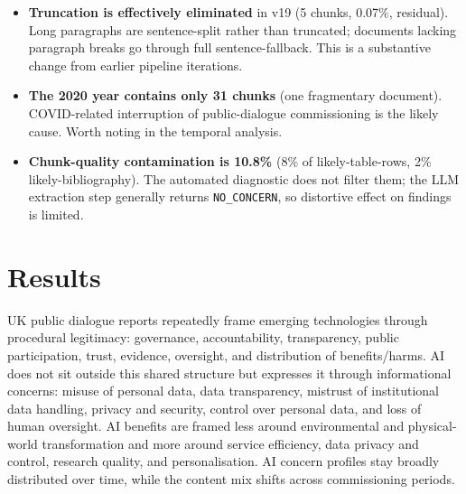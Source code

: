 \documentclass[11pt, a4paper]{article}
\begin{document}
\begin{itemize}
\item \textbf{Truncation is effectively eliminated} in v19 (5 chunks,
      0.07\%, residual).  Long paragraphs are sentence-split rather than
      truncated; documents lacking paragraph breaks go through full
      sentence-fallback.  This is a substantive change from earlier
      pipeline iterations.
\item \textbf{The 2020 year contains only 31 chunks} (one fragmentary
      document).  COVID-related interruption of public-dialogue
      commissioning is the likely cause.  Worth noting in the temporal
      analysis.
\item \textbf{Chunk-quality contamination is 10.8\%} (8\% of
      likely-table-rows, 2\% likely-bibliography).  The automated
      diagnostic does not filter them; the LLM extraction step generally
      returns \texttt{NO\_CONCERN}, so distortive effect on findings is
      limited.
\end{itemize}

\section{Results}

UK public dialogue reports repeatedly frame emerging technologies through
procedural legitimacy: governance, accountability, transparency, public
participation, trust, evidence, oversight, and distribution of
benefits/harms.  AI does not sit outside this shared structure but
expresses it through informational concerns: misuse of personal data,
data transparency, mistrust of institutional data handling, privacy and
security, control over personal data, and loss of human oversight.  AI
benefits are framed less around environmental and physical-world
transformation and more around service efficiency, data privacy and
control, research quality, and personalisation.  AI concern profiles stay
broadly distributed over time, while the content mix shifts across
commissioning periods.

\end{document}
